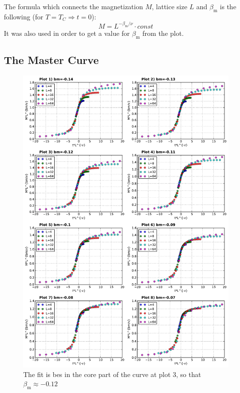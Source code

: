 \documentclass[12pt,a4paper]{scrartcl}
\begin{document}
The formula which connects the magnetization $M$, lattice size $L$ and $\beta_\text{m}$ is the following (for $T=T_C \Rightarrow t = 0$):
\begin{equation*}
	M = L^{-\beta_\text{m}/\nu} \cdot const
\end{equation*}
It was also used in order to get a value for $\beta_\text{m}$ from the plot.

\subsection{The Master Curve}

\begin{figure}[H]
\includegraphics[width=13.0cm]{../plots/4window_01.pdf}
\caption{The fit is bes in the core part of the curve at plot 3, so that $\beta_\text{m} \approx -0.12$}
\end{figure}
\end{document}
